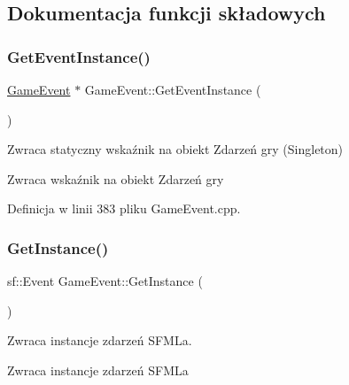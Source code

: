 \subsection{Dokumentacja funkcji składowych}
\mbox{\label{class_game_event_a683bf5025fe1a31263cb96059fc9e5a5}} 
\subsubsection{\texorpdfstring{Get\+Event\+Instance()}{GetEventInstance()}}
{\footnotesize\ttfamily \mbox{\hyperlink{class_game_event}{Game\+Event}} $\ast$ Game\+Event\+::\+Get\+Event\+Instance (\begin{DoxyParamCaption}{ }\end{DoxyParamCaption})\hspace{0.3cm}{\ttfamily [static]}}



Zwraca statyczny wskaźnik na obiekt Zdarzeń gry (Singleton) 

\begin{DoxyReturn}{Zwraca}
wskaźnik na obiekt Zdarzeń gry 
\end{DoxyReturn}


Definicja w linii 383 pliku Game\+Event.\+cpp.

\mbox{\label{class_game_event_adbf21138a4eb40624a0f40b2ff75f6db}} 
\subsubsection{\texorpdfstring{Get\+Instance()}{GetInstance()}}
{\footnotesize\ttfamily sf\+::\+Event Game\+Event\+::\+Get\+Instance (\begin{DoxyParamCaption}{ }\end{DoxyParamCaption})}



Zwraca instancje zdarzeń S\+F\+ML\textquotesingle{}a. 

\begin{DoxyReturn}{Zwraca}
instancje zdarzeń S\+F\+ML\textquotesingle{}a 
\end{DoxyReturn}


